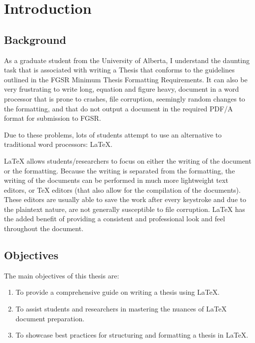 \chapter{Introduction}\label{ch:Introduction}\section{Background}
		As a graduate student from the University of Alberta, I understand the daunting task that is associated with writing a Thesis that conforms to the guidelines outlined in the FGSR Minimum Thesis Formatting Requirements. 
		It can also be very frustrating to write long, equation and figure heavy, document in a word processor that is prone to crashes, file corruption, seemingly random changes to the formatting, and that do not output a document in the required PDF/A format for submission to FGSR.
		
		Due to these problems, lots of students attempt to use an alternative to traditional word processors: \LaTeX. 
		
		\LaTeX{} allows students/researchers to focus on either the writing of the document or the formatting. 
		Because the writing is separated from the formatting, the writing of the documents can be performed in much more lightweight text editors, or \TeX{} editors (that also allow for the compilation of the documents). 
		These editors are usually able to save the work after every keystroke and due to the plaintext nature, are not generally susceptible to file corruption.
		\LaTeX{} has the added benefit of providing a consistent and professional look and feel throughout the document. 

	\section{Objectives}
		The main objectives of this thesis are:
		\begin{enumerate}
			\item To provide a comprehensive guide on writing a thesis using \LaTeX{}.
			\item To assist students and researchers in mastering the nuances of \LaTeX{} document preparation.
			\item To showcase best practices for structuring and formatting a thesis in \LaTeX{}.
		\end{enumerate}

